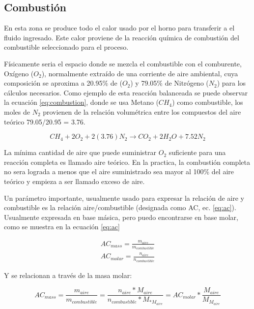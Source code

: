 \subsection{Combustión}
\par En esta zona se produce todo el calor usado por el horno para transferir a el fluido ingresado. Este calor proviene de la reacción química de combustión del combustible seleccionado para el proceso.

\par Físicamente seria el espacio donde se mezcla el combustible con el comburente, Oxígeno ($O_2$),
normalmente extraído de una corriente de aire ambiental, cuya composición se aproxima a 20.95\% de ($O_2$) y 79.05\% de Nitrógeno ($N_2$) para los cálculos necesarios. Como ejemplo de esta reacción balanceada se puede observar la ecuación \ref{eq:combustion}, donde se usa Metano ($CH_4$) como combustible, los moles de $N_2$ provienen de la relación volumétrica entre los compuestos del aire teórico 79.05/20.95 = 3.76.

\begin{equation}
    \label{eq:combustion}
    CH_4 + 2O_2 + 2(3.76)N_2 \rightarrow CO_2 + 2H_2O + 7.52N_2
\end{equation}

\par La mínima cantidad de aire que puede suministrar $O_2$ suficiente para una reacción completa es llamado aire teórico. En la practica, la combustión completa no sera lograda a menos que el aire suministrado sea mayor al 100\% del aire teórico y empieza a ser llamado exceso de aire.

\par Un parámetro importante, usualmente usado para expresar la relación de aire y combustible es la relación aire/combustible (designada como AC, ec. \ref{eq:ac}). Usualmente expresada en base másica, pero puedo encontrarse en base molar, como se muestra en la ecuación \ref{eq:ac}

\begin{gather}
    \label{eq:ac}
    AC_{mass} = \frac{m_{aire}}{m_{combustible}}\\
    AC_{molar} = \frac{n_{aire}}{n_{combustible}}
\end{gather}

\par Y se relacionan a través de la masa molar:

\begin{equation}
    AC_{mass} = \frac{m_{aire}}{m_{combustible}} =
    \frac{n_{aire}*M_{aire}}{n_{combustible}*M_{*M_{aire}}} = AC_{molar}*\frac{M_{aire}}{M_{M_{aire}}}
\end{equation}

